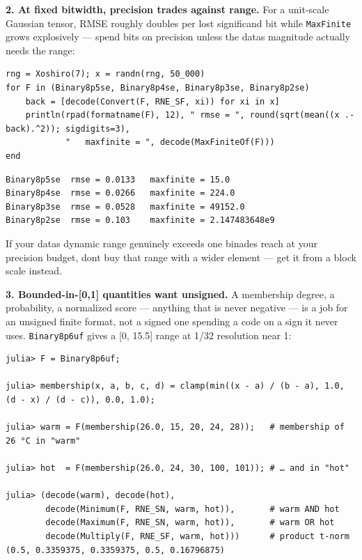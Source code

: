 \textbf{2. At fixed bitwidth, precision trades against range.} For a unit-scale Gaussian tensor, RMSE roughly doubles per lost significand bit while \texttt{MaxFinite} grows explosively — spend bits on precision unless the data{\textquotesingle}s magnitude actually needs the range:




\nopagebreak[4]
\begin{minipage}{\linewidth}
\begin{verbatim}
rng = Xoshiro(7); x = randn(rng, 50_000)
for F in (Binary8p5se, Binary8p4se, Binary8p3se, Binary8p2se)
    back = [decode(Convert(F, RNE_SF, xi)) for xi in x]
    println(rpad(formatname(F), 12), " rmse = ", round(sqrt(mean((x .- back).^2)); sigdigits=3),
            "   maxfinite = ", decode(MaxFiniteOf(F)))
end
\end{verbatim}




\begin{verbatim}
Binary8p5se  rmse = 0.0133   maxfinite = 15.0
Binary8p4se  rmse = 0.0266   maxfinite = 224.0
Binary8p3se  rmse = 0.0528   maxfinite = 49152.0
Binary8p2se  rmse = 0.103    maxfinite = 2.147483648e9
\end{verbatim}
\end{minipage}




If your data{\textquotesingle}s dynamic range genuinely exceeds one binade{\textquotesingle}s reach at your precision budget, don{\textquotesingle}t buy that range with a wider element — get it from a block scale instead.



\textbf{3. Bounded-in-[0,1] quantities want unsigned.} A membership degree, a probability, a normalized score — anything that is never negative — is a job for an unsigned finite format, not a signed one spending a code on a sign it never uses. \texttt{Binary8p6uf} gives a [0, 15.5] range at 1/32 resolution near 1:




\nopagebreak[4]
\begin{verbatim}
julia> F = Binary8p6uf;

julia> membership(x, a, b, c, d) = clamp(min((x - a) / (b - a), 1.0, (d - x) / (d - c)), 0.0, 1.0);

julia> warm = F(membership(26.0, 15, 20, 24, 28));   # membership of 26 °C in "warm"

julia> hot  = F(membership(26.0, 24, 30, 100, 101)); # … and in "hot"

julia> (decode(warm), decode(hot),
        decode(Minimum(F, RNE_SN, warm, hot)),       # warm AND hot
        decode(Maximum(F, RNE_SN, warm, hot)),       # warm OR hot
        decode(Multiply(F, RNE_SF, warm, hot)))      # product t-norm
(0.5, 0.3359375, 0.3359375, 0.5, 0.16796875)
\end{verbatim}




